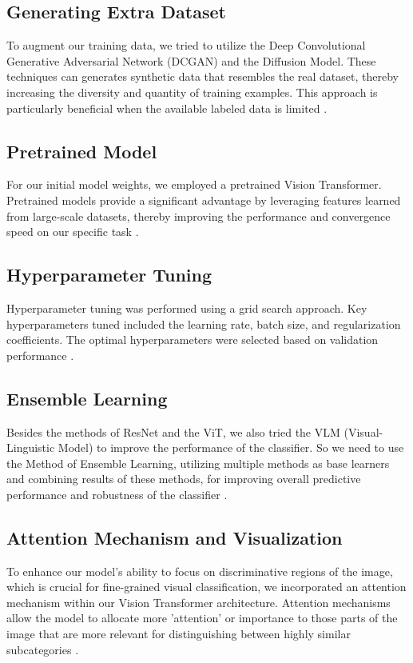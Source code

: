 \subsection{Generating Extra Dataset}
To augment our training data, we tried to utilize the Deep Convolutional Generative Adversarial Network (DCGAN) and the Diffusion Model. These techniques can generates synthetic data that resembles the real dataset, thereby increasing the diversity and quantity of training examples. This approach is particularly beneficial when the available labeled data is limited \cite{radford2015unsupervised}.

\subsection{Pretrained Model}
For our initial model weights, we employed a pretrained Vision Transformer. Pretrained models provide a significant advantage by leveraging features learned from large-scale datasets, thereby improving the performance and convergence speed on our specific task \cite{dosovitskiy2020image}.

\subsection{Hyperparameter Tuning}
Hyperparameter tuning was performed using a grid search approach. Key hyperparameters tuned included the learning rate, batch size, and regularization coefficients. The optimal hyperparameters were selected based on validation performance \cite{bergstra2012random}.

\subsection{Ensemble Learning}
Besides the methods of ResNet and the ViT, we also tried the VLM (Visual-Linguistic Model) to improve the performance of the classifier. So we need to use the Method of Ensemble Learning, utilizing multiple methods as base learners and combining results of these methods, for improving overall predictive performance and robustness of the classifier \cite{zhou2012ensemble}.

\subsection{Attention Mechanism and Visualization}
To enhance our model's ability to focus on discriminative regions of the image, which is crucial for fine-grained visual classification, we incorporated an attention mechanism within our Vision Transformer architecture. Attention mechanisms allow the model to allocate more 'attention' or importance to those parts of the image that are more relevant for distinguishing between highly similar subcategories \cite{vaswani2017attention}.

